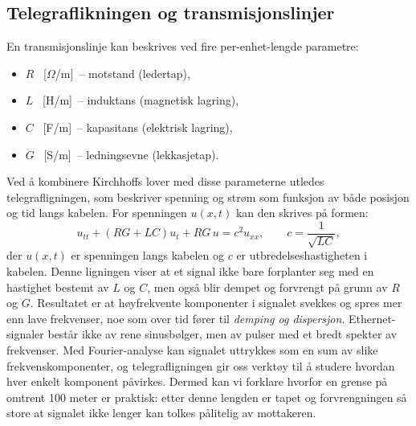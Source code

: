 \subsection{Telegraflikningen og transmisjonslinjer}
En transmisjonslinje kan beskrives ved fire per-enhet-lengde parametre:
\begin{itemize}
    \item $R$ \, [$\Omega$/m] \,-- motstand (ledertap),
    \item $L$ \, [H/m] \,-- induktans (magnetisk lagring),
    \item $C$ \, [F/m] \,-- kapasitans (elektrisk lagring),
    \item $G$ \, [S/m] \,-- ledningsevne (lekkasjetap).
\end{itemize}
Ved å kombinere Kirchhoffs lover med disse parameterne utledes telegrafligningen, som beskriver spenning og strøm som funksjon av både posisjon og tid langs kabelen. For spenningen $u(x,t)$ kan den skrives på formen:
\begin{equation}
    u_{tt} + (RG + LC)u_t + RG\,u = c^2 u_{xx}, \qquad c = \frac{1}{\sqrt{LC}} ,
\end{equation}
der $u(x,t)$ er spenningen langs kabelen og $c$ er utbredelseshastigheten i kabelen.  
Denne ligningen viser at et signal ikke bare forplanter seg med en hastighet bestemt av $L$ og $C$, men også blir dempet og forvrengt på grunn av $R$ og $G$. Resultatet er at høyfrekvente komponenter i signalet svekkes og spres mer enn lave frekvenser, noe som over tid fører til \emph{demping og dispersjon}.  
Ethernet-signaler består ikke av rene sinusbølger, men av pulser med et bredt spekter av frekvenser. Med Fourier-analyse kan signalet uttrykkes som en sum av slike frekvenskomponenter, og telegrafligningen gir oss verktøy til å studere hvordan hver enkelt komponent påvirkes. Dermed kan vi forklare hvorfor en grense på omtrent 100 meter er praktisk: etter denne lengden er tapet og forvrengningen så store at signalet ikke lenger kan tolkes pålitelig av mottakeren.

